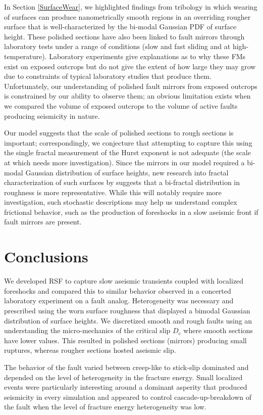 \documentclass[preprint,1p, 10pt,authoryear]{elsarticle}
\begin{document}
In Section \ref{SurfaceWear}, we highlighted findings from tribology in which wearing of surfaces can produce nanometrically smooth regions in an overriding rougher surface that is well-characterized by the bi-modal Gaussian PDF of surface height. These polished sections have also been linked to fault mirrors through laboratory tests under a range of conditions (slow and fast sliding and at high-temperature).  Laboratory experiments give explanations as to why these FMs exist on exposed outcrops but do not give the extent of how large they may grow due to constraints of typical laboratory studies that produce them. Unfortunately, our understanding of polished fault mirrors from exposed outcrops is constrained by our ability to observe them; an obvious limitation exists when we compared the volume of exposed outcrops to the volume of active faults producing seismicity in nature.  

Our model suggests that the scale of polished sections to rough sections is important; correspondingly, we conjecture that attempting to capture this using the single fractal measurement of the Hurst exponent is not adequate (the scale at which needs more investigation). Since the mirrors in our model required a bi-modal Gaussian distribution of surface heights, new research into fractal characterization of such surfaces by \citet{Hu2019} suggests that a bi-fractal distribution in roughness is more representative. While this will notably require more investigation, such stochastic descriptions may help us understand complex frictional behavior, such as the production of foreshocks in a slow aseismic front if fault mirrors are present.

\section{Conclusions}
We developed RSF to capture slow aseismic transients coupled with localized foreshocks and compared this to similar behavior observed in a concerted laboratory experiment on a fault analog. Heterogeneity was necessary and prescribed using the worn surface roughness that displayed a bimodal Gaussian distribution of surface heights. We discretized smooth and rough faults using an understanding the micro-mechanics of the critical slip $D_{c}$ where smooth sections have lower values. This resulted in polished sections (mirrors) producing small ruptures, whereas rougher sections hosted aseismic slip.  

The behavior of the fault varied between creep-like to stick-slip dominated and depended on the level of heterogeneity in the fracture energy. Small localized events were particularly interesting around a dominant asperity that produced seismicity in every simulation and appeared to control cascade-up-breakdown of the fault when the level of fracture energy heterogeneity was low. 
\end{document}
